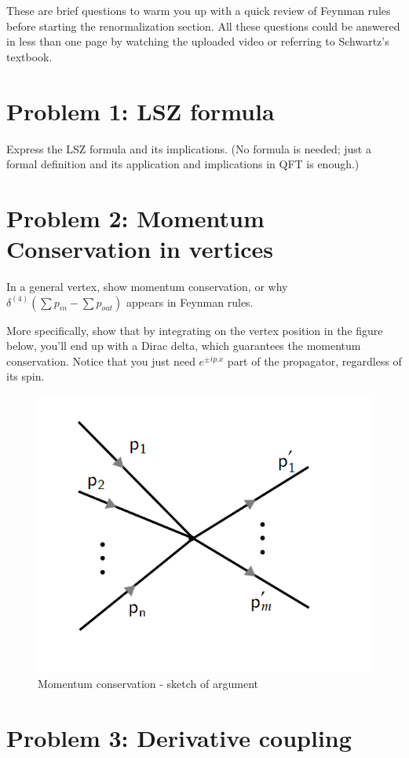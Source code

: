 \documentclass[11pt]{article}
\begin{document}
	
	
	\psetheader
	These are brief questions to warm you up with a quick review of Feynman rules before starting the renormalization section. All these questions could be answered in less than one page by watching the uploaded video or referring to Schwartz’s textbook.
	\section*{Problem 1: LSZ formula}
	
	\begin{problem}
		Express the LSZ formula and its implications. (No formula is needed; just a formal definition and its application and implications in QFT is enough.)
	\end{problem}

	\section*{Problem 2: Momentum Conservation in vertices}

\begin{problem}
	In a general vertex, show momentum conservation, or why $\delta^{(4)}(\sum p_{in} - \sum p_{out})$ appears in Feynman rules.
	
	\noindent
	More specifically, show that by integrating on the vertex position in the figure below, you'll end up with a Dirac delta, which guarantees the momentum conservation. Notice that you just need $e^{\pm ip.x}$ part of the propagator, regardless of its spin.
	
	\begin{figure}[H]
		\centering
		\includegraphics[width=0.4\linewidth]{img/1.png}
		\caption{Momentum conservation - sketch of argument}
	\end{figure}

	
\end{problem}

\newpage
	\section*{Problem 3: Derivative coupling }
\end{document}
